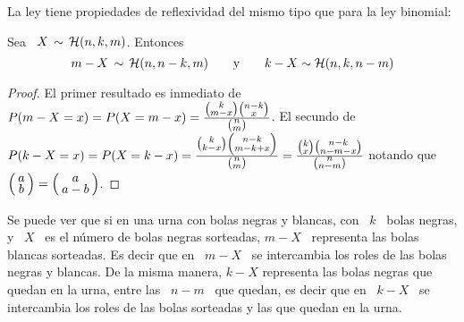 La ley tiene propiedades de reflexividad del mismo tipo que para la ley binomial:
%
\begin{lema}[Reflexividad]
\label{Lem:MP:ReflexividadHipergeometrica}
%
  Sea \ $X \, \sim \, \mathcal{H}(n,k,m)$. Entonces
  \[
  m-X \, \sim \, \mathcal{H}(n,n-k,m) \qquad \mbox{y} \qquad k-X \sim \mathcal{H}(n,k,n-m)
  \]
\end{lema}
%
\begin{proof}
  El  primer   resultado  es  inmediato  de  $P(m-X   =  x)  =  P(X   =  m-x)  =
  \frac{\smallbino{k}{m-x} \smallbino{n-k}{x}}{\smallbino{n}{m}}$. El secundo de
  $P(k-X    =     x)    =     P(X    =    k-x)     =    \frac{\smallbino{k}{k-x}
    \smallbino{n-k}{m-k+x}}{\smallbino{n}{m}}      =      \frac{\smallbino{k}{x}
    \smallbino{n-k}{n-m-x}}{\smallbino{n}{n-m}}$  notando   que  $\bino{a}{b}  =
  \bino{a}{a-b}$.
\end{proof}
%
Se puede ver  que si en una urna con  bolas negras y blancas, con  \ $k$ \ bolas
negras, y \ $X$  \ es el n\'umero de bolas negras  sorteadas, $m-X$ \ representa
las bolas blancas sorteadas. Es decir que  en \ $m-X$ \ se intercambia los roles
de las bolas  negras y blancas.  De la misma manera,  $k-X$ representa las bolas
negras que quedan en la urna, entre las  \ $n-m$ \ que quedan, es decir que en \
$k-X$ \ se intercambia  los roles de las bolas sorteadas y  las que quedan en la
urna.



